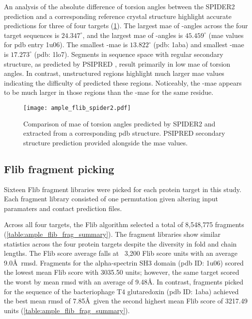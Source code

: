An analysis of the absolute difference of torsion angles between the SPIDER2 \cite{Heffernan2015-wp} prediction and a corresponding reference crystal structure highlight accurate predictions for three of four targets (\cref{fig:ample_flib_spider2}). The largest \gls{mae} of \textphi-angles across the four target sequences is $24.347^{\circ}$, and the largest \gls{mae} of \textpsi-angles is $45.459^{\circ}$ (\gls{mae} values for \gls{pdb} entry 1u06). The smallest \textphi-\gls{mae} is $13.822^{\circ}$ (\gls{pdb}: 1aba) and smallest \textpsi-\gls{mae} is $17.273^{\circ}$ (\gls{pdb}: 1lo7). Segments in sequence space with regular secondary structure, as predicted by PSIPRED \cite{Jones1999-fi}, result primarily in low \gls{mae} of torsion angles. In contrast, unstructured regions highlight much larger \gls{mae} values indicating the difficulty of predicted these regions. Noticeably, the \textpsi-\gls{mae} appears to be much larger in those regions than the \textphi-\gls{mae} for the same residue.

\begin{figure}[H]
	\centering
	\texttt{[image: ample\_flib\_spider2.pdf]}
	\caption[SPIDER2 torsion angle prediction analysis of Flib targets]{Comparison of \gls{mae} of torsion angles predicted by SPIDER2 and extracted from a corresponding \gls{pdb} structure. PSIPRED \cite{Jones1999-fi} secondary structure prediction provided alongside the \gls{mae} values.}
	\label{fig:ample_flib_spider2}
\end{figure}

\subsection{Flib fragment picking}

Sixteen Flib fragment libraries were picked for each protein target in this study. Each fragment library consisted of one permutation given altering input paramaters and contact prediction files.

Across all four targets, the Flib algorithm selected a total of 8,548,775 fragments (\cref{table:ample_flib_frag_summary}). The fragment libraries show similar statistics across the four protein targets despite the diversity in fold and chain lengths. The Flib score average falls at ~3,200 Flib score units with an average 9.0\AA\ \gls{rmsd}. Fragments for the alpha-spectrin SH3 domain (\gls{pdb} ID: 1u06) scored the lowest mean Flib score with 3035.50 units; however, the same target scored the worst by mean \gls{rmsd} with an average of 9.48\AA. In contrast, fragments picked for the sequence of the bacteriophage T4 glutaredoxin (\gls{pdb} ID: 1aba) achieved the best mean \gls{rmsd} of 7.85\AA\ given the second highest mean Flib score of 3217.49 units (\cref{table:ample_flib_frag_summary}).

